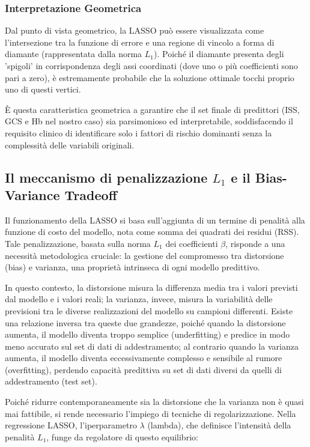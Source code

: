 \documentclass[11pt, oneside, noexaminfo]{sapthesis}   	%
\begin{document}
\subsubsection{Interpretazione Geometrica}
Dal punto di vista geometrico, la LASSO può essere visualizzata come l'intersezione tra la funzione di errore e una regione di vincolo a forma di diamante (rappresentata dalla norma $L_1$). Poiché il diamante presenta degli 'spigoli' in corrispondenza degli assi coordinati (dove uno o più coefficienti sono pari a zero), è estremamente probabile che la soluzione ottimale tocchi proprio uno di questi vertici.

È questa caratteristica geometrica a garantire che il set finale di predittori (ISS, GCS e Hb nel nostro caso) sia parsimonioso ed interpretabile, soddisfacendo il requisito clinico di identificare solo i fattori di rischio dominanti senza la complessità delle variabili originali.

\subsection{Il meccanismo di penalizzazione $L_1$ e il Bias-Variance Tradeoff}
Il funzionamento della LASSO si basa sull'aggiunta di un termine di penalità alla funzione di costo del modello, nota come somma dei quadrati dei residui (RSS). Tale penalizzazione, basata sulla norma $L_1$ dei coefficienti $\beta$, risponde a una necessità metodologica cruciale: la gestione del compromesso tra distorsione (bias) e varianza, una proprietà intrinseca di ogni modello predittivo.

In questo contesto, la distorsione misura la differenza media tra i valori previsti dal modello e i valori reali; la varianza, invece, misura la variabilità delle previsioni tra le diverse realizzazioni del modello su campioni differenti. Esiste una relazione inversa tra queste due grandezze, poiché quando la distorsione aumenta, il modello diventa troppo semplice (underfitting) e predice in modo meno accurato sul set di dati di addestramento; al contrario quando la varianza aumenta, il modello diventa eccessivamente complesso e sensibile al rumore (overfitting), perdendo capacità predittiva su set di dati diversi da quelli di addestramento (test set).

Poiché ridurre contemporaneamente sia la distorsione che la varianza non è quasi mai fattibile, si rende necessario l'impiego di tecniche di regolarizzazione. Nella regressione LASSO, l'iperparametro $\lambda$ (lambda), che definisce l'intensità della penalità $L_1$, funge da regolatore di questo equilibrio:
\end{document}
